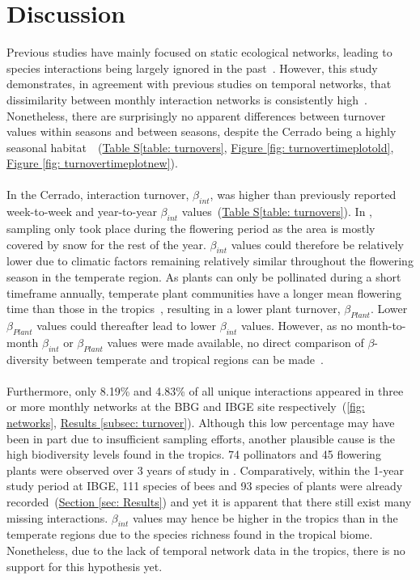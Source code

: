 \documentclass[11pt]{article}
\begin{document}
\newpage
\section{Discussion} %
Previous studies have mainly focused on static ecological networks, leading to species interactions being largely ignored in the past~\citep{Poisot2015}. However, this study demonstrates, in agreement with previous studies on temporal networks, that dissimilarity between monthly interaction networks is consistently high~\citep{Olesen2008, Burkle2013, CaraDonna2017}. Nonetheless, there are surprisingly no apparent differences between turnover values within seasons and between seasons, despite the Cerrado being a highly seasonal habitat~\citep{Kricher2011}~(\hyperref[table: turnovers]{Table S\ref{table: turnovers}}, \hyperref[fig: turnovertimeplotold]{Figure \ref{fig: turnovertimeplotold}}, \hyperref[fig: turnovertimeplotnew]{Figure \ref{fig: turnovertimeplotnew}}). \\
\\
In the Cerrado, interaction turnover, $\beta_{int}$, was higher than previously reported week-to-week and year-to-year $\beta_{int}$ values~\citep{CaraDonna2017}(\hyperref[table: turnovers]{Table S\ref{table: turnovers}}). In \cite{CaraDonna2017}, sampling only took place during the flowering period as the area is mostly covered by snow for the rest of the year. $\beta_{int}$ values could therefore be relatively lower due to climatic factors remaining relatively similar throughout the flowering season in the temperate region. As plants can only be pollinated during a short timeframe annually, temperate plant communities have a longer mean flowering time than those in the tropics~\citep{Bawa1990}, resulting in a lower plant turnover, $\beta_{Plant}$. Lower $\beta_{Plant}$ values could thereafter lead to lower $\beta_{int}$ values. However, as no month-to-month $\beta_{int}$ or $\beta_{Plant}$ values were made available, no direct comparison of $\beta$-diversity between temperate and tropical regions can be made~\citep{CaraDonna2017}. \\
\\
Furthermore, only 8.19\% and 4.83\% of all unique interactions appeared in three or more monthly networks at the BBG and IBGE site respectively~(\autoref{fig: networks}, \hyperref[subsec: turnover]{Results \ref{subsec: turnover}}). Although this low percentage may have been in part due to insufficient sampling efforts, another plausible cause is the high biodiversity levels found in the tropics. 74 pollinators and 45 flowering plants were observed over 3 years of study in \cite{CaraDonna2017}. Comparatively, within the 1-year study period at IBGE, 111 species of bees and 93 species of plants were already recorded~(\hyperref[sec: Results]{Section \ref{sec: Results}}) and yet it is apparent that there still exist many missing interactions. $\beta_{int}$ values may hence be higher in the tropics than in the temperate regions due to the species richness found in the tropical biome. Nonetheless, due to the lack of temporal network data in the tropics, there is no support for this hypothesis yet.\\
\end{document}

